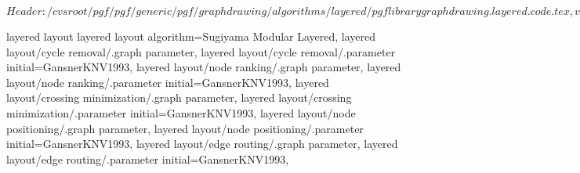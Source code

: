 %
%
%

\ProvidesFileRCS[v\pgfversion] $Header: /cvsroot/pgf/pgf/generic/pgf/graphdrawing/algorithms/layered/pgflibrarygraphdrawing.layered.code.tex,v 1.10 2012/04/01 21:54:46 tantau Exp $






%
%




%
%
\pgfgddeclarealgorithmkey
  {layered layout}
  {layered layout}
  {
    algorithm=Sugiyama Modular Layered,
    layered layout/cycle removal/.graph parameter,
    layered layout/cycle removal/.parameter initial=GansnerKNV1993,
    layered layout/node ranking/.graph parameter,
    layered layout/node ranking/.parameter initial=GansnerKNV1993,
    layered layout/crossing minimization/.graph parameter,
    layered layout/crossing minimization/.parameter initial=GansnerKNV1993,
    layered layout/node positioning/.graph parameter,
    layered layout/node positioning/.parameter initial=GansnerKNV1993,
    layered layout/edge routing/.graph parameter,
    layered layout/edge routing/.parameter initial=GansnerKNV1993,
  }




\endinput
